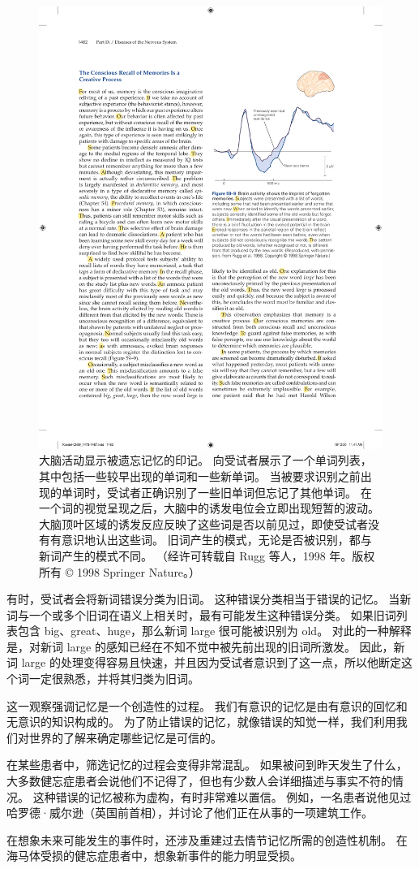 \begin{figure}[htbp]
	\centering
	\includegraphics[width=0.5\linewidth]{chap59/fig_59_9}
	\caption{大脑活动显示被遗忘记忆的印记。 向受试者展示了一个单词列表，其中包括一些较早出现的单词和一些新单词。 当被要求识别之前出现的单词时，受试者正确识别了一些旧单词但忘记了其他单词。 在一个词的视觉呈现之后，大脑中的诱发电位会立即出现短暂的波动。 大脑顶叶区域的诱发反应反映了这些词是否以前见过，即使受试者没有有意识地认出这些词。 旧词产生的模式，无论是否被识别，都与新词产生的模式不同。 （经许可转载自 Rugg 等人，1998 年。版权所有 © 1998 Springer Nature。）}
	\label{fig:59_9}
\end{figure}

有时，受试者会将新词错误分类为旧词。 这种错误分类相当于错误的记忆。 当新词与一个或多个旧词在语义上相关时，最有可能发生这种错误分类。 如果旧词列表包含 big、great、huge，那么新词 large 很可能被识别为 old。 对此的一种解释是，对新词 large 的感知已经在不知不觉中被先前出现的旧词所激发。 因此，新词 large 的处理变得容易且快速，并且因为受试者意识到了这一点，所以他断定这个词一定很熟悉，并将其归类为旧词。

这一观察强调记忆是一个创造性的过程。 我们有意识的记忆是由有意识的回忆和无意识的知识构成的。 为了防止错误的记忆，就像错误的知觉一样，我们利用我们对世界的了解来确定哪些记忆是可信的。

在某些患者中，筛选记忆的过程会变得非常混乱。 如果被问到昨天发生了什么，大多数健忘症患者会说他们不记得了，但也有少数人会详细描述与事实不符的情况。 这种错误的记忆被称为虚构，有时非常难以置信。 例如，一名患者说他见过哈罗德·威尔逊（英国前首相），并讨论了他们正在从事的一项建筑工作。

在想象未来可能发生的事件时，还涉及重建过去情节记忆所需的创造性机制。 在海马体受损的健忘症患者中，想象新事件的能力明显受损。


